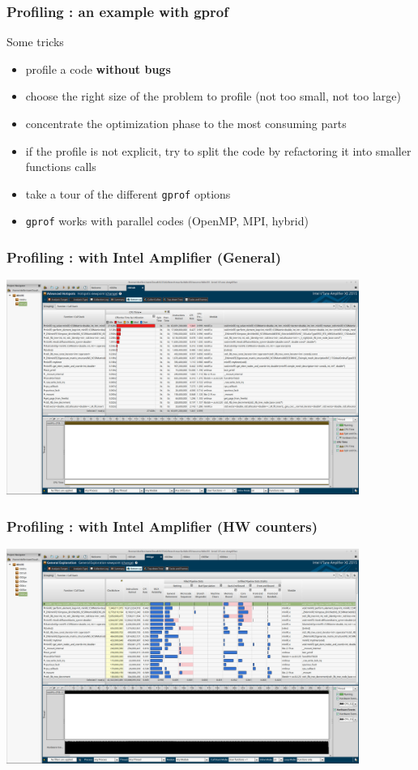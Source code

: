 \begin{frame}
	\frametitle{Profiling : an example with gprof}

Some tricks

	\begin{itemize}
	\item profile a code {\bf without bugs}
	\item choose the right size of the problem to profile (not too small, not too large)
	\item concentrate the optimization phase to the most consuming parts
	\item if the profile is not explicit, try to split the code by refactoring it into smaller functions calls
	\item take a tour of the different {\tt gprof} options
	\item {\tt gprof} works with parallel codes (OpenMP, MPI, hybrid)
	\end{itemize}
\end{frame}

\begin{frame}[containsverbatim]
	\frametitle{Profiling : with Intel Amplifier (General)}
	\includegraphics[width=115mm]{Day1/images/Amplifier1.jpg}
\end{frame}

\begin{frame}[containsverbatim]
	\frametitle{Profiling : with Intel Amplifier (HW counters)}
	\includegraphics[width=115mm]{Day1/images/Amplifier2.jpg}
\end{frame}

